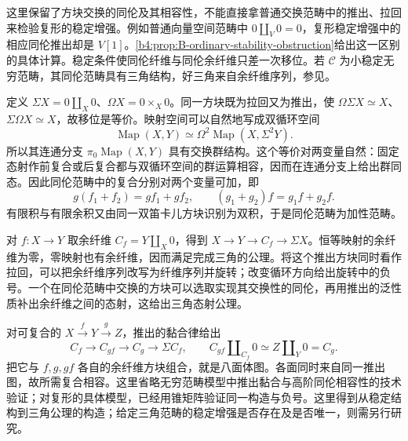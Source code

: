 这里保留了方块交换的同伦及其相容性，不能直接拿普通交换范畴中的推出、拉回来检验复形的稳定增强。例如普通向量空间范畴中 \(0\amalg_V0=0\)，复形稳定增强中的相应同伦推出却是 \(V[1]\)。\cref{b4:prop:B-ordinary-stability-obstruction}给出这一区别的具体计算。稳定条件使同伦纤维与同伦余纤维只差一次移位。若 \(\mathcal C\) 为小稳定无穷范畴，其同伦范畴具有三角结构，好三角来自余纤维序列，参见\cite[Definition 2.12 and the following paragraph, p. 749]{BlumbergGepnerTabuada2013UniversalKTheory}。
\begin{proofsketch}
	定义 \(\Sigma X=0\amalg_X0\)、\(\Omega X=0\times_X0\)。同一方块既为拉回又为推出，使 \(\Omega\Sigma X\simeq X\)、\(\Sigma\Omega X\simeq X\)，故移位是等价。映射空间可以自然地写成双循环空间
	\[
		\operatorname{Map}(X,Y)\simeq \Omega^2\operatorname{Map}(X,\Sigma^2Y).
	\]
	所以其连通分支 \(\pi_0\operatorname{Map}(X,Y)\) 具有交换群结构。这个等价对两变量自然：固定态射作前复合或后复合都与双循环空间的群运算相容，因而在连通分支上给出群同态。因此同伦范畴中的复合分别对两个变量可加，即
	\[
		g(f_1+f_2)=gf_1+gf_2,\qquad (g_1+g_2)f=g_1f+g_2f.
	\]
	有限积与有限余积又由同一双笛卡儿方块识别为双积，于是同伦范畴为加性范畴。

	对 \(f:X\to Y\) 取余纤维 \(C_f=Y\amalg_X0\)，得到 \(X\to Y\to C_f\to\Sigma X\)。恒等映射的余纤维为零，零映射也有余纤维，因而满足完成三角的公理。将这个推出方块同时看作拉回，可以把余纤维序列改写为纤维序列并旋转；改变循环方向给出旋转中的负号。一个在同伦范畴中交换的方块可以选取实现其交换性的同伦，再用推出的泛性质补出余纤维之间的态射，这给出三角态射公理。

	对可复合的 \(X\xrightarrow fY\xrightarrow gZ\)，推出的黏合律给出
	\[
		C_f\longrightarrow C_{gf}\longrightarrow C_g \longrightarrow\Sigma C_f, \qquad C_{gf}\amalg_{C_f}0\simeq Z\amalg_Y0=C_g.
	\]
	把它与 \(f,g,gf\) 各自的余纤维方块组合，就是八面体图。各面同时来自同一推出图，故所需复合相容。这里省略无穷范畴模型中推出黏合与高阶同伦相容性的技术验证；对复形的具体模型，已经用锥矩阵验证同一构造与负号。这里得到从稳定结构到三角公理的构造；给定三角范畴的稳定增强是否存在及是否唯一，则需另行研究。
\end{proofsketch}

